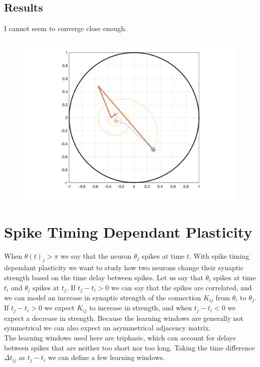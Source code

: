 \subsection{Results}
I cannot seem to converge close enough.
\begin{figure}[H]
\centering
\includegraphics[width = \textwidth]{../Figures/ProblemsWithNewtonRaphson.png}
\end{figure}


\section{Spike Timing Dependant Plasticity}
When $\theta(t)_j > \pi$ we say that the neuron $\theta_j$ spikes at time $t$. With spike timing dependant plasticity we want to study how two neurons change their synaptic strength based on the time delay between spikes. 
Let us say that $\theta_i$ spikes at time $t_i$ and $\theta_j$ spikes at $t_j$. If $t_j - t_i > 0$ we can say that the spikes are correlated, and we can model an increase in synaptic strength of the connection $K_{ij}$ from $\theta_i$ to $\theta_j$. If $t_j - t_i > 0$ we expect $K_{ij}$ to increase in strength, and when $t_j - t_i < 0$ we expect a decrease in strength. Because the learning windows are generally not symmetrical we can also expect an asymmetrical adjacency matrix.\\
The learning windows used here are triphasic, which can account for delays between spikes that are neither too short nor too long. Taking the time difference $\Delta t_{ij}$ as $t_j - t_i$ we can define a few learning windows.

